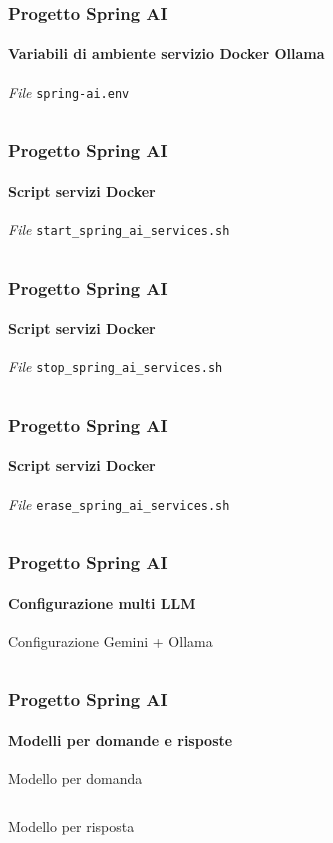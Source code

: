%
\begin{frame}[t,fragile] \frametitle{Progetto Spring AI}
    \framesubtitle{Variabili di ambiente servizio Docker Ollama}
        \begin{block}{\textit{File} \texttt{spring-ai.env}}
			{\tiny\inputminted{text}{code/spring-ai.env}}
    	\end{block}
\end{frame}
%
\begin{frame}[t,fragile] \frametitle{Progetto Spring AI}
    \framesubtitle{Script servizi Docker}
        \begin{block}{\textit{File} \texttt{start\_spring\_ai\_services.sh}}
			{\tiny\inputminted{bash}{code/start_spring_ai_services.sh}}
    	\end{block}

\end{frame}
%
\begin{frame}[t,fragile] \frametitle{Progetto Spring AI}
    \framesubtitle{Script servizi Docker}
        \begin{block}{\textit{File} \texttt{stop\_spring\_ai\_services.sh}}
			{\tiny\inputminted{bash}{code/stop_spring_ai_services.sh}}
    	\end{block}
\end{frame}
%
\begin{frame}[t,fragile] \frametitle{Progetto Spring AI}
    \framesubtitle{Script servizi Docker}
        \begin{block}{\textit{File} \texttt{erase\_spring\_ai\_services.sh}}
			{\tiny\inputminted{bash}{code/erase_spring_ai_services.sh}}
    	\end{block}

\end{frame}
%
\begin{frame}[t,fragile] \frametitle{Progetto Spring AI}
    \framesubtitle{Configurazione multi LLM}
        \vspace*{-.7cm}
        \begin{block}{Configurazione Gemini + Ollama}
			{\tiny\inputminted{java}{code/ChatClientConfig.java}}
    	\end{block}

\end{frame}
%
\begin{frame}[t,fragile] \frametitle{Progetto Spring AI}
    \framesubtitle{Modelli per domande e risposte}
        \begin{block}{Modello per domanda}
			{\tiny\inputminted{java}{code/Question.java}}
    	\end{block}
        \begin{block}{Modello per risposta}
			{\tiny\inputminted{java}{code/Answer.java}}
    	\end{block}
\end{frame}
